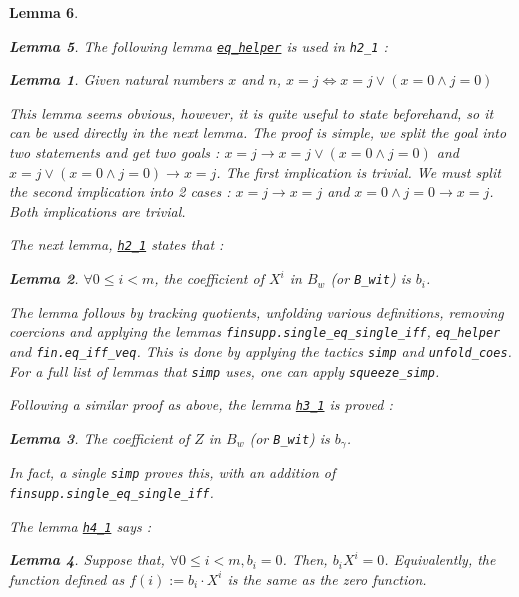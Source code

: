\documentclass{article}
\newtheorem{lemma}{Lemma}
\theoremstyle{definition}
\theoremstyle{remark}
\begin{document}
\begin{lemma}
\begin{lemma}
The following lemma \href{https://github.com/BoltonBailey/formal-snarks-project/blob/7fd9cd122f5887f88f6a706b4f2a68a7153c7381/src/snarks/babysnark/knowledge_soundness.lean#L211}{\texttt{eq\_helper}} 
is used in \texttt{h2\_1} :
\theoremstyle{lemma}
\begin{lemma} 
    Given natural numbers $x$ and $n$, $x = j \iff x = j \vee (x = 0 \wedge j = 0) $
\end{lemma}

This lemma seems obvious, however, it is quite useful to state beforehand, so it can be used directly in the next lemma.
The proof is simple, we split the goal into two statements and get two goals : $x = j \to x = j \vee (x = 0 \wedge j = 0)$ and 
$x = j \vee (x = 0 \wedge j = 0) \to x = j$. The first implication is trivial. We must split the second implication into 2 cases :
$x = j \to x = j$ and $x = 0 \wedge j = 0 \to x = j$. Both implications are trivial. 

The next lemma, \href{https://github.com/BoltonBailey/formal-snarks-project/blob/7fd9cd122f5887f88f6a706b4f2a68a7153c7381/src/snarks/babysnark/knowledge_soundness.lean#L223}{\texttt{h2\_1}} states that :
\theoremstyle{lemma} \label{h2_1}
\begin{lemma}
    $\forall 0 \le i < m$, the coefficient of $X^{i}$ in $B_{w}$ (or \texttt{B\_wit}) is $b_i$.
\end{lemma}

The lemma follows by tracking quotients, unfolding various definitions, removing coercions and applying the lemmas \texttt{finsupp.single\_eq\_single\_iff}, \texttt{eq\_helper} and \texttt{fin.eq\_iff\_veq}. This is done by applying the tactics 
\texttt{simp} and \texttt{unfold\_coes}. For a full list of lemmas that \texttt{simp} uses, one can apply \texttt{squeeze\_simp}.

Following a similar proof as above, the lemma \href{https://github.com/BoltonBailey/formal-snarks-project/blob/7fd9cd122f5887f88f6a706b4f2a68a7153c7381/src/snarks/babysnark/knowledge_soundness.lean#L244}{\texttt{h3\_1}} is proved : 
\theoremstyle{lemma} \label{h3_1}
\begin{lemma}
    The coefficient of $Z$ in $B_{w}$ (or \texttt{B\_wit}) is $b_{\gamma}$.
\end{lemma}

In fact, a single \texttt{simp} proves this, with an addition of \texttt{finsupp.single\_eq\_single\_iff}.

The lemma \href{https://github.com/BoltonBailey/formal-snarks-project/blob/7fd9cd122f5887f88f6a706b4f2a68a7153c7381/src/snarks/babysnark/knowledge_soundness.lean#L261}{\texttt{h4\_1}} says :
\theoremstyle{lemma}
\begin{lemma} \label{h4_1}
    Suppose that, $\forall 0 \le i < m, b_{i} = 0$. Then, $b_i X^i = 0$. Equivalently, the function defined as $f(i) := b_i \cdot X^i$ is the same as the zero function.
\end{lemma}


\end{lemma}
\end{lemma}
\end{document}
